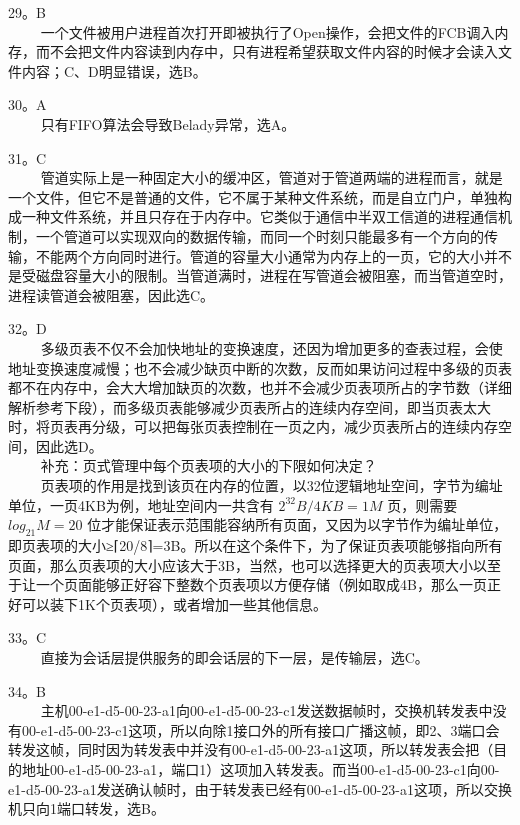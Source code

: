 29。B \\
$\qquad$ 一个文件被用户进程首次打开即被执行了Open操作，会把文件的FCB调入内存，而不会把文件内容读到内存中，只有进程希望获取文件内容的时候才会读入文件内容；C、D明显错误，选B。

30。A \\
$\qquad$ 只有FIFO算法会导致Belady异常，选A。

31。C \\
$\qquad$ 管道实际上是一种固定大小的缓冲区，管道对于管道两端的进程而言，就是一个文件，但它不是普通的文件，它不属于某种文件系统，而是自立门户，单独构成一种文件系统，并且只存在于内存中。它类似于通信中半双工信道的进程通信机制，一个管道可以实现双向的数据传输，而同一个时刻只能最多有一个方向的传输，不能两个方向同时进行。管道的容量大小通常为内存上的一页，它的大小并不是受磁盘容量大小的限制。当管道满时，进程在写管道会被阻塞，而当管道空时，进程读管道会被阻塞，因此选C。

32。D \\
$\qquad$ 多级页表不仅不会加快地址的变换速度，还因为增加更多的查表过程，会使地址变换速度减慢；也不会减少缺页中断的次数，反而如果访问过程中多级的页表都不在内存中，会大大增加缺页的次数，也并不会减少页表项所占的字节数（详细解析参考下段），而多级页表能够减少页表所占的连续内存空间，即当页表太大时，将页表再分级，可以把每张页表控制在一页之内，减少页表所占的连续内存空间，因此选D。 \\
$\qquad$ 补充：页式管理中每个页表项的大小的下限如何决定？ \\
$\qquad$ 页表项的作用是找到该页在内存的位置，以32位逻辑地址空间，字节为编址单位，一页4KB为例，地址空间内一共含有 $2^{32}B/4KB=1M$ 页，则需要 $log_21M=20$ 位才能保证表示范围能容纳所有页面，又因为以字节作为编址单位，即页表项的大小≥⌈20/8⌉=3B。所以在这个条件下，为了保证页表项能够指向所有页面，那么页表项的大小应该大于3B，当然，也可以选择更大的页表项大小以至于让一个页面能够正好容下整数个页表项以方便存储（例如取成4B，那么一页正好可以装下1K个页表项），或者增加一些其他信息。

33。C \\
$\qquad$ 直接为会话层提供服务的即会话层的下一层，是传输层，选C。

34。B \\
$\qquad$ 主机00-e1-d5-00-23-a1向00-e1-d5-00-23-c1发送数据帧时，交换机转发表中没有00-e1-d5-00-23-c1这项，所以向除1接口外的所有接口广播这帧，即2、3端口会转发这帧，同时因为转发表中并没有00-e1-d5-00-23-a1这项，所以转发表会把（目的地址00-e1-d5-00-23-a1，端口1）这项加入转发表。而当00-e1-d5-00-23-c1向00-e1-d5-00-23-a1发送确认帧时，由于转发表已经有00-e1-d5-00-23-a1这项，所以交换机只向1端口转发，选B。

